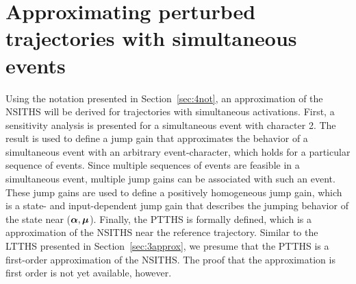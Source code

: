 \documentclass[../DC2019003Bouma.tex]{subfiles}
\begin{document}
\section{Approximating perturbed trajectories with simultaneous events}
Using the notation presented in Section~\ref{sec:4not}, an approximation of the NSITHS will be derived for trajectories with simultaneous activations. First, a sensitivity analysis is presented for a simultaneous event with character 2. The result is used to define a jump gain that approximates the behavior of a simultaneous event with an arbitrary event-character, which holds for a particular sequence of events. Since multiple sequences of events are feasible in a simultaneous event, multiple jump gains can be associated with such an event. These jump gains are used to define a positively homogeneous jump gain, which is a state- and input-dependent jump gain that describes the jumping behavior of the state near ($\boldsymbol{\alpha},\boldsymbol{\mu}$). Finally, the PTTHS is formally defined, which is a approximation of the NSITHS near the reference trajectory. Similar to the LTTHS presented in Section~\ref{sec:3approx}, we presume that the PTTHS is a first-order approximation of the NSITHS. The proof that the approximation is first order is not yet available, however.
\end{document}
